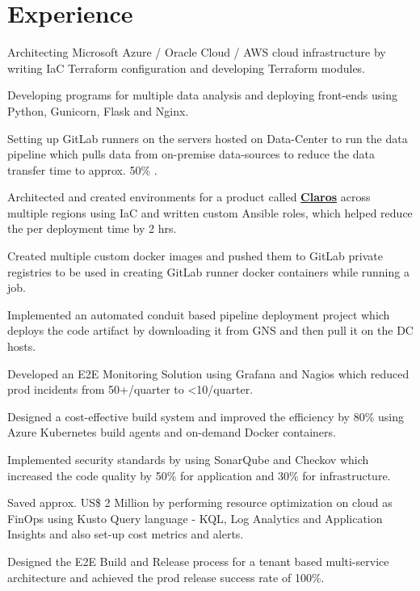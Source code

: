 \documentclass[a4paper]{deedy-resume-openfont}
\begin{document}
\begin{minipage}[t]{0.66\textwidth}
\section{Experience}
\vspace{\topsep} %
\begin{tightemize} %
\item Architecting Microsoft Azure / Oracle Cloud / AWS cloud infrastructure by writing IaC Terraform configuration and developing Terraform modules.
\item Developing programs for multiple data analysis and deploying front-ends using Python, Gunicorn, Flask and Nginx.
\item Setting up GitLab runners on the servers hosted on Data-Center to run the data pipeline which pulls data from on-premise data-sources to reduce the data transfer time to approx. 50\% .
\item Architected and created environments for a product called \href{https://www.hach.com/claros/overview#claros-video}{\bf Claros} across multiple regions using IaC and written custom Ansible roles, which helped reduce the per deployment time by 2 hrs.
\item Created multiple custom docker images and pushed them to GitLab private registries to be used in creating GitLab runner docker containers while running a job.
\item Implemented an automated conduit based pipeline deployment project which deploys the code artifact by downloading it from GNS and then pull it on the DC hosts.
\item Developed an E2E Monitoring Solution using Grafana and Nagios which reduced prod incidents from 50+/quarter to <10/quarter.
\item Designed a cost-effective build system and improved the efficiency by 80\% using Azure Kubernetes build agents and on-demand Docker containers.
\item Implemented security standards by using SonarQube and Checkov which increased the code quality by 50\% for application and 30\% for infrastructure.
\item Saved approx. US\$ 2 Million by performing resource optimization on cloud as FinOps using Kusto Query language - KQL, Log Analytics and Application Insights and also set-up cost metrics and alerts.
\item Designed the E2E Build and Release process for a tenant based multi-service architecture and achieved the prod release success rate of 100\%.

\end{tightemize}
\end{minipage}
\end{document}
